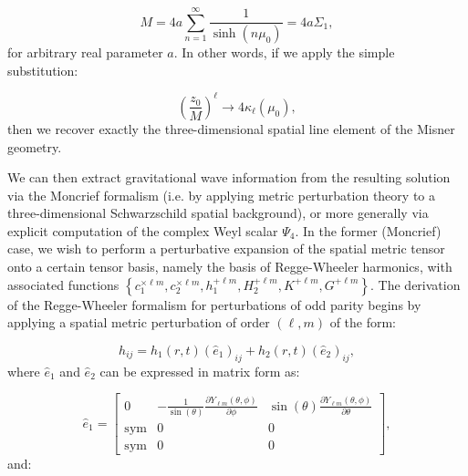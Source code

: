 \documentclass{article}
\begin{document}
\begin{equation}
M = 4a \sum_{n = 1}^{\infty} \frac{1}{\sinh \left( n \mu_0 \right)} = 4a \Sigma_1,
\end{equation}
for arbitrary real parameter $a$. In other words, if we apply the simple substitution:

\begin{equation}
\left( \frac{z_0}{M} \right)^{\ell} \to 4 \kappa_{\ell} \left( \mu_0 \right),
\end{equation}
then we recover exactly the three-dimensional spatial line element of the Misner geometry.

We can then extract gravitational wave information from the resulting solution via the Moncrief formalism\cite{moncrief}\cite{moncrief2} (i.e. by applying metric perturbation theory to a three-dimensional Schwarzschild spatial background), or more generally via explicit computation of the complex Weyl scalar ${\Psi_4}$\cite{loffler}. In the former (Moncrief) case, we wish to perform a perturbative expansion of the spatial metric tensor onto a certain tensor basis, namely the basis of Regge-Wheeler harmonics\cite{regge}, with associated functions ${\left\lbrace c_{1}^{\times \ell m}, c_{2}^{\times \ell m}, h_{1}^{+ \ell m}, H_{2}^{+ \ell m}, K^{+ \ell m}, G^{+ \ell m} \right\rbrace}$. The derivation of the Regge-Wheeler formalism for perturbations of odd parity begins by applying a spatial metric perturbation of order ${\left( \ell, m \right)}$ of the form:

\begin{equation}
h_{i j} = h_1 \left( r, t \right) \left( \hat{e}_1 \right)_{i j} + h_2 \left( r, t \right) \left( \hat{e}_2 \right)_{i j},
\end{equation}
where ${\hat{e}_1}$ and ${\hat{e}_2}$ can be expressed in matrix form as:

\begin{equation}
\hat{e}_1 = \begin{bmatrix}
0 & - \frac{1}{\sin \left( \theta \right)} \frac{\partial Y_{\ell m} \left( \theta, \phi \right)}{\partial \phi} & \sin \left( \theta \right) \frac{\partial Y_{\ell m} \left( \theta, \phi \right)}{\partial \theta}\\
\mathrm{sym} & 0 & 0\\
\mathrm{sym} & 0 & 0
\end{bmatrix},
\end{equation}
and:
\end{document}
